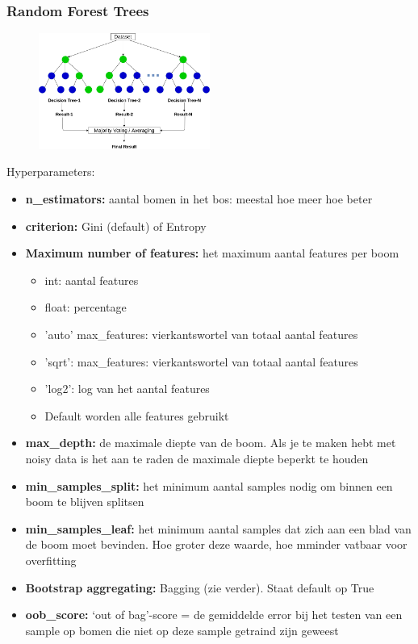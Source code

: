 \documentclass{article}
\begin{document}
\subsubsection{Random Forest Trees}

\begin{figure}[H]
    \centering
    \includegraphics[width=0.5\textwidth]{bagging-random-forest-trees.png}
\end{figure}

Hyperparameters:

\begin{itemize}
    \item \textbf{n\_estimators:} aantal bomen in het bos: meestal hoe meer hoe beter
    \item \textbf{criterion: } Gini (default) of Entropy
    \item \textbf{Maximum number of features:} het maximum aantal features per boom
    \begin{itemize}
        \item int: aantal features
        \item float: percentage
        \item 'auto' max\_features: vierkantswortel van totaal aantal features
        \item 'sqrt': max\_features: vierkantswortel van totaal aantal features
        \item 'log2': log van het aantal features
        \item Default worden alle features gebruikt
    \end{itemize}
    \item \textbf{max\_depth:} de maximale diepte van de boom. Als je te maken hebt met noisy data is het aan te raden de maximale diepte beperkt te houden
    \item \textbf{min\_samples\_split:} het minimum aantal samples nodig om binnen een boom te blijven splitsen
    \item \textbf{min\_samples\_leaf:} het minimum aantal samples dat zich aan een blad van de boom moet bevinden. Hoe groter deze waarde, hoe mminder vatbaar voor overfitting
    \item \textbf{Bootstrap aggregating: } Bagging (zie verder). Staat default op True
    \item \textbf{oob\_score:} `out of bag'-score = de gemiddelde error bij het testen van een sample op bomen die niet op deze sample getraind zijn geweest
\end{itemize}
\end{document}
